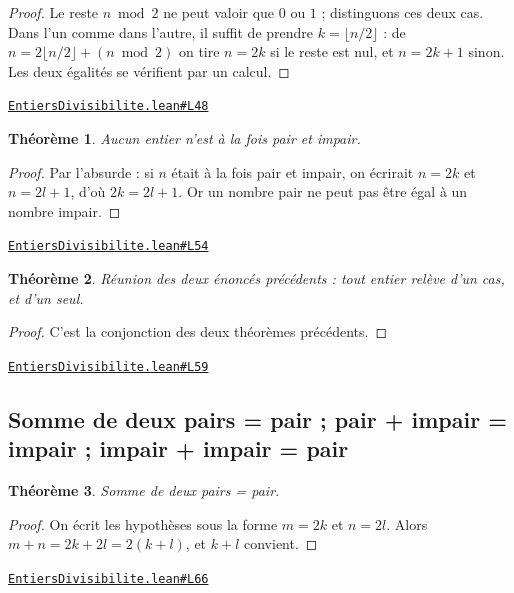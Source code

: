 \documentclass[11pt,a4paper]{article}
\theoremstyle{definition}
\theoremstyle{plain}
\newtheorem{theoreme}{Théorème}
\newcommand{\source}[2]{\par\smallskip\noindent\hfill{\footnotesize\href{#1}{\texttt{#2}}}\par\smallskip}
\begin{document}
\begin{proof}
Le reste $n \bmod 2$ ne peut valoir que $0$ ou $1$ ; distinguons ces deux cas. Dans
l'un comme dans l'autre, il suffit de prendre $k = \lfloor n/2 \rfloor$ : de
$n = 2\lfloor n/2 \rfloor + (n \bmod 2)$ on tire $n = 2k$ si le reste est nul, et
$n = 2k + 1$ sinon. Les deux égalités se vérifient par un calcul.
\end{proof}
\source{https://github.com/Commutator-IO/learn-lean/blob/main/courses/01-college/01-nombres-et-calculs/EntiersDivisibilite.lean\#L48}{EntiersDivisibilite.lean\#L48}

\begin{theoreme}
Aucun entier n'est à la fois pair et impair.
\end{theoreme}

\begin{proof}
Par l'absurde : si $n$ était à la fois pair et impair, on écrirait $n = 2k$ et
$n = 2l + 1$, d'où $2k = 2l + 1$. Or un nombre pair ne peut pas être égal à un nombre
impair.
\end{proof}
\source{https://github.com/Commutator-IO/learn-lean/blob/main/courses/01-college/01-nombres-et-calculs/EntiersDivisibilite.lean\#L54}{EntiersDivisibilite.lean\#L54}

\begin{theoreme}
Réunion des deux énoncés précédents : tout entier relève d'un cas, et d'un seul.
\end{theoreme}

\begin{proof}
C'est la conjonction des deux théorèmes précédents.
\end{proof}
\source{https://github.com/Commutator-IO/learn-lean/blob/main/courses/01-college/01-nombres-et-calculs/EntiersDivisibilite.lean\#L59}{EntiersDivisibilite.lean\#L59}

\subsection{Somme de deux pairs = pair ; pair + impair = impair ; impair + impair = pair}

\begin{theoreme}
Somme de deux pairs = pair.
\end{theoreme}

\begin{proof}
On écrit les hypothèses sous la forme $m = 2k$ et $n = 2l$. Alors
$m + n = 2k + 2l = 2(k+l)$, et $k + l$ convient.
\end{proof}
\source{https://github.com/Commutator-IO/learn-lean/blob/main/courses/01-college/01-nombres-et-calculs/EntiersDivisibilite.lean\#L66}{EntiersDivisibilite.lean\#L66}
\end{document}
